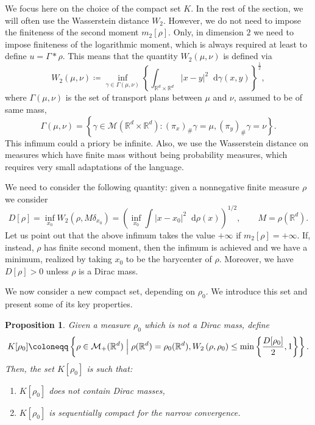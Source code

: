 \documentclass[11pt,a4paper]{article}
\numberwithin{equation}{section}
\newcommand{\R}{{\mathbb{R}}}
\newcommand{\Rd}{{\R^d}}
\theoremstyle{plain}
\newtheorem{proposition}[theorem]{Proposition}
\theoremstyle{remark}
\newcommand{\diff}{\mathop{}\!\mathrm{d}}
\begin{document}
We focus here on the choice of the compact set $K$. In the rest of the section, we will often use the Wasserstein distance $W_2$. However, we do not need to impose the finiteness of the second moment $m_2[\rho]$. Only, in dimension $2$ we need to impose finiteness of the logarithmic moment, which is always required at least to define $u=\Gamma\ast\rho$. This means that the quantity $W_2(\mu,\nu)$ is defined via
$$
       W_2 (\mu , \nu) \coloneqq \inf_{\gamma \in \Gamma (\mu , \nu)} \left\{ \int_{\Rd \times \Rd} | x - y |^2 \diff \gamma (x, y) \right\}^{\frac{1}{2}},
$$
where $\Gamma (\mu , \nu)$ is the set of transport plans between $\mu$ and $\nu$, assumed to be of same mass,
    \begin{equation*}
        \Gamma (\mu , \nu ) = \left\{ \gamma \in \mathcal{M} (\Rd \times \Rd) : (\pi_x)_\# \gamma = \mu, (\pi_y)_\# \gamma = \nu \right\}.
    \end{equation*}
This infimum could a priory be infinite. Also, we use the Wasserstein distance on measures which have finite mass without being probability measures, which requires very small adaptations of the language.

We need to consider the following quantity: given a nonnegative finite measure $\rho$ we consider 
$$
D[\rho]=\inf_{x_0}W_2(\rho,M\delta_{x_0})
=\left(\inf_{x_0}\int|x-x_0|^2\diff\rho(x)\right)^{1/2},
\qquad M=\rho(\R^d).
$$
Let us point out that the above infimum takes the value $+\infty$ if $m_2[\rho]=+\infty$. If, instead, $\rho$ has finite second moment, then the infimum is achieved and we have a  minimum, realized by taking $x_0$ to be the barycenter of $\rho$. Moreover, we have $D[\rho]>0$ unless $\rho$ is a Dirac mass.

We now consider a new compact set, depending on $\rho_0$. We introduce this set and present some of its key properties.

\begin{proposition}\label{prop:compact_set_no_ Dirac}
Given a measure $\rho_0$ which is not a Dirac mass, define
\begin{equation}\label{def:set K}
K[\rho_0]
  \coloneqq 
 \left\{
\rho \in \mathcal{M}_{+}(\R^d)
   \Bigm| 
\rho(\R^d)=\rho_0(\R^d), 
W_{2} \left(\rho,\rho_0 \right) \le  \min\left\{\frac{D[\rho_0]}{2},1\right\}
 \right\}.
\end{equation}
Then, the set $K[\rho_0]$ is such that: 
\begin{enumerate}
\item $K[\rho_0]$ does \emph{not} contain  Dirac masses,
\item $K[\rho_0]$ is sequentially compact for the narrow convergence.
\end{enumerate}
\end{proposition}
\end{document}
